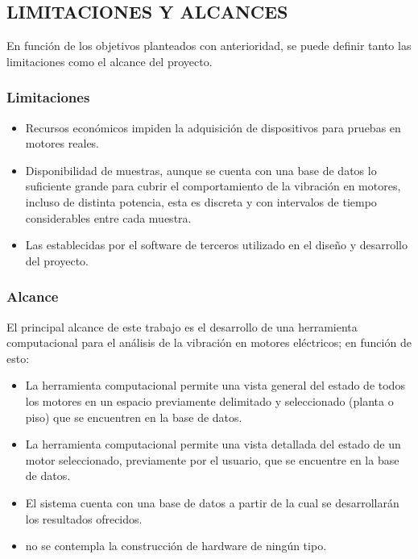 
\subsection{LIMITACIONES Y ALCANCES}
    En función de los objetivos planteados con anterioridad, se puede definir
    tanto las limitaciones como el alcance del proyecto.

\subsubsection{Limitaciones}
\begin{itemize}
    \item Recursos económicos impiden la adquisición de dispositivos para
        pruebas en motores reales.

    \item Disponibilidad de muestras, aunque se cuenta con una base de datos lo
        suficiente grande para cubrir el comportamiento de la vibración en
        motores, incluso de distinta potencia, esta es discreta y con
        intervalos de tiempo considerables entre cada muestra.


    \item Las establecidas por el software de terceros utilizado en el diseño
        y desarrollo del proyecto.
\end{itemize}

\subsubsection{Alcance}
    El principal alcance de este trabajo es el desarrollo de una herramienta
    computacional para el análisis de la vibración en motores eléctricos; en
    función de esto:

	\begin{itemize}
        \item La herramienta computacional permite una vista general del estado
            de todos los motores en un espacio previamente delimitado y
            seleccionado (planta o piso) que se encuentren en la base de datos.

        \item La herramienta computacional permite una vista detallada del
            estado de un motor seleccionado, previamente por el usuario, que se
            encuentre en la base de datos.

        \item El sistema cuenta con una base de datos a partir de la cual se
            desarrollarán los resultados ofrecidos.

        \item no se contempla la construcción de hardware de ningún tipo.


	\end{itemize}

